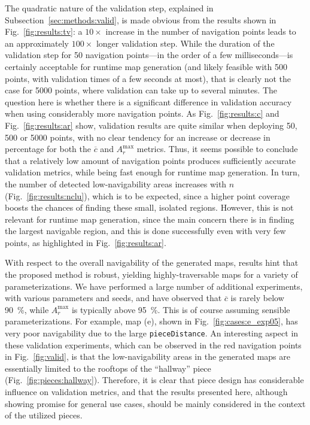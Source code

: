 \documentclass[journal]{IEEEtran}
\begin{document}
The quadratic nature of the validation step, explained in Subsection~\ref{sec:methods:valid},
is made obvious from the results shown in Fig.~\ref{fig:results:tv}: a $10\times$ increase in
the number of navigation points leads to an approximately $100\times$ longer validation step.
While the duration of the validation step for 50 navigation points---in the order of a few
milliseconds---is certainly acceptable for runtime map generation (and likely feasible with
500 points, with validation times of a few seconds at most), that is clearly not the case for
5000 points, where validation can take up to several minutes. The question here is whether
there is a significant difference in validation accuracy when using considerably more navigation
points. As Fig.~\ref{fig:results:c} and Fig.~\ref{fig:results:ar} show, validation results
are quite similar when deploying 50, 500 or 5000 points, with no clear tendency for an
increase or decrease in percentage for both the $\overline{c}$ and $A_r^\text{max}$ metrics.
Thus, it seems possible to conclude that a relatively low amount of navigation points
produces sufficiently accurate validation metrics, while being fast enough for runtime map
generation. In turn, the number of detected low-navigability areas increases with $n$
(Fig.~\ref{fig:results:nclu}), which is to be expected, since a higher point coverage boosts
the chances of finding these small, isolated regions. However, this is not relevant for runtime
map generation, since the main concern there is in finding the largest navigable region, and
this is done successfully even with very few points, as highlighted in Fig.~\ref{fig:results:ar}.

With respect to the overall navigability of the generated maps, results hint that the
proposed method is robust, yielding highly-traversable maps for a variety of
parameterizations. We have performed a large number of additional experiments, with
various parameters and seeds, and have observed that $\overline{c}$ is rarely below
\SI{90}{\percent}, while $A_r^\text{max}$ is typically above \SI{95}{\percent}. This is
of course assuming sensible parameterizations. For example, map (e), shown in
Fig.~\ref{fig:cases:e_exp05}, has very poor navigability due to the large
\texttt{pieceDistance}. An interesting aspect in these validation experiments, which can
be observed in the red navigation points in Fig.~\ref{fig:valid}, is that the
low-navigability areas in the generated maps are essentially limited to the rooftops of
the ``hallway'' piece (Fig.~\ref{fig:pieces:hallway}). Therefore, it is clear that piece
design has considerable influence on validation metrics, and that the results presented
here, although showing promise for general use cases, should be mainly considered in the
context of the utilized pieces.
\end{document}
